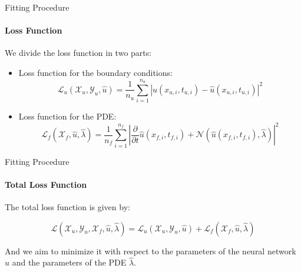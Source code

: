 \begin{frame}{Fitting Procedure}
\framesubtitle{Loss Function}

We divide the loss function in two parts:

\begin{itemize}
    \item Loss function for the boundary conditions:
    \begin{equation}
        \mathcal{L}_u (\mathcal{X}_u, \mathcal{Y}_u, \hat{u}) = \frac{1}{n_u} \sum_{i=1}^{n_u} \left| u(x_{u,i}, t_{u,i}) - \hat{u}(x_{u,i}, t_{u,i})  \right|^2
    \end{equation}
    \item Loss function for the PDE:
    \begin{equation}
        \mathcal{L}_f (\mathcal{X}_f, \hat{u}, \hat{\lambda})= \frac{1}{n_f} \sum_{i=1}^{n_f} \left| \frac{\partial }{\partial t}\hat{u}(x_{f,i}, t_{f, i}) + \mathcal{N}(\hat{u}(x_{f,i}, t_{f, i}), \hat{\lambda}) \right|^2
    \end{equation}
\end{itemize}
\end{frame}

\begin{frame}{Fitting Procedure}
\framesubtitle{Total Loss Function}

The total loss function is given by:

\begin{equation}
    \mathcal{L}(\mathcal{X}_u, \mathcal{Y}_u,\mathcal{X}_f, \hat{u}, \hat{\lambda}) = \mathcal{L}_u (\mathcal{X}_u, \mathcal{Y}_u, \hat{u}) + \mathcal{L}_f (\mathcal{X}_f, \hat{u}, \hat{\lambda})
\end{equation}

And we aim to minimize it with respect to the parameters of the neural network $\hat{u}$ and the parameters of the PDE $\hat{\lambda}$.

\end{frame}